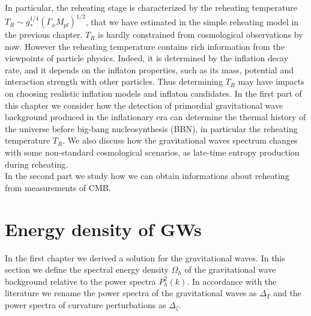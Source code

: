 \documentclass[11pt,a4paper,twoside]{book}
\begin{document}
In particular, the reheating stage is characterized by the reheating temperature $ T_{R} \sim g_{*}^{1/4}(\Gamma_{\phi}M_{pl})^{1/2} $, that we have estimated in the simple reheating model in the previous chapter. $ T_{R} $ is hardly constrained from cosmological observations by now. However the reheating temperature contains rich information from the viewpoints of particle physics. Indeed, it is determined by the inflation decay rate, and it depends on the inflaton properties, such as its mass, potential and interaction strength with other particles. Thus determining  $ T_{R} $ may have impacts on choosing realistic inflation models and inflaton candidates. In the first part of this chapter we consider how the detection of primordial gravitational wave background produced in the inflationary era can determine the thermal history of the universe before big-bang nucleosynthesis (BBN), in particular the reheating temperature $ T_{R} $. We also discuss how the gravitational waves spectrum changes with some non-standard cosmological scenarios, as late-time entropy production during reheating.\\
In the second part we study how we can obtain informations about reheating from measurements of CMB.
\section{Energy density of GWs}
In the first chapter we derived a solution for the gravitational waves. In this section we define the spectral energy density $\Omega_{h}$ of the gravitational wave background relative to the power spectra $ P^{2}_{h}(k)$. In accordance with the literature we rename the power spectra of the gravitational waves as $ \Delta_{T} $ and the power spectra of curvature perturbations as $\Delta_{\zeta}$.
\end{document}
